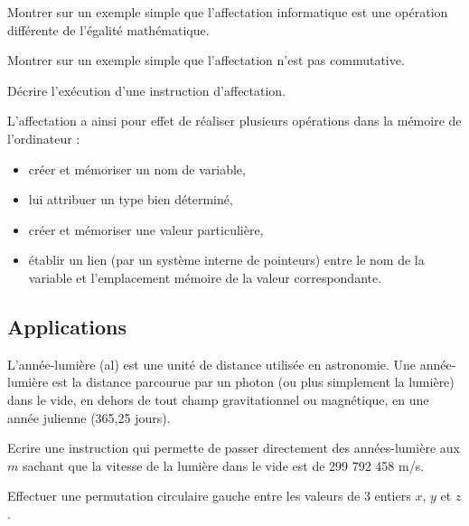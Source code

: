\begin{question}
Montrer sur un exemple simple que l'affecta\-tion informatique est une opération différente de l'égalité mathématique.
\end{question}

\begin{question}
Montrer sur un exemple simple que l'affec\-tation n'est pas commutative.
\end{question}

\begin{question}
Décrire l'exécution d'une instruction d'affectation.
\end{question}

L'affectation a ainsi pour effet de réaliser plusieurs opérations dans la mémoire de l'ordinateur :
\begin{itemize}
\item créer et mémoriser un nom de variable,
\item lui attribuer un type bien déterminé,
\item créer et mémoriser une valeur particulière,
\item établir un lien (par un système interne de pointeurs) entre le nom de la variable 
	et l'emplacement mémoire de la valeur correspondante.
\end{itemize}

\subsection{Applications}
\begin{question}
L'année-lumière (al) est une unité de distance utilisée en astronomie. 
Une année-lumière est la distance parcourue par un photon (ou plus simplement la lumière) 
dans le vide, en dehors de tout champ gravitationnel ou magnétique, en une année julienne 
(365,25 jours). 

Ecrire une instruction qui permette de passer directement des années-lumière aux $m$ sachant que
la vitesse de la lumière dans le vide est de 299 792 458 m/s.
\end{question}

\begin{question}
Effectuer une permutation circulaire gauche entre les valeurs de 3 entiers $x$, $y$ et $z$.
\end{question}

